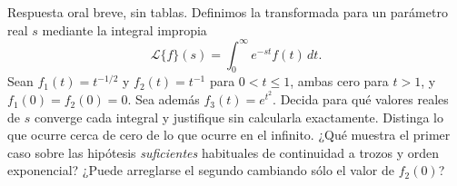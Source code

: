 Respuesta oral breve, sin tablas. Definimos la transformada para un parámetro real \(s\) mediante la integral impropia
\[
\mathcal L\{f\}(s)=\int_0^\infty e^{-st}f(t)\,dt.
\]
Sean \(f_1(t)=t^{-1/2}\) y \(f_2(t)=t^{-1}\) para \(0<t\le1\), ambas cero para \(t>1\), y \(f_1(0)=f_2(0)=0\). Sea además \(f_3(t)=e^{t^2}\). Decida para qué valores reales de \(s\) converge cada integral y justifique sin calcularla exactamente. Distinga lo que ocurre cerca de cero de lo que ocurre en el infinito. ¿Qué muestra el primer caso sobre las hipótesis \emph{suficientes} habituales de continuidad a trozos y orden exponencial? ¿Puede arreglarse el segundo cambiando sólo el valor de \(f_2(0)\)?
